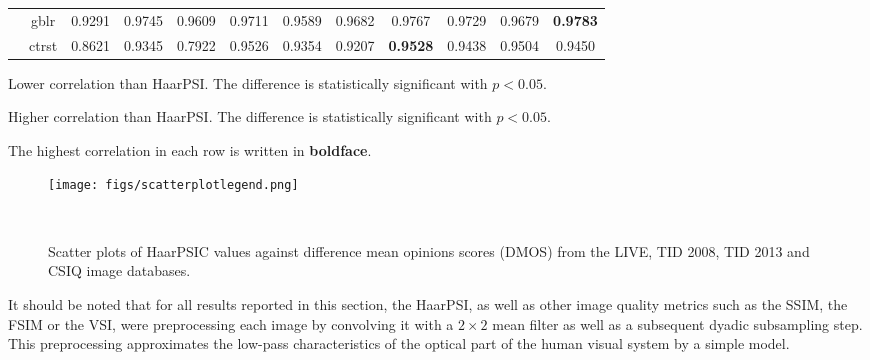 \documentclass[11pt,a4paper]{article}
\begin{document}
\begin{table}[!htb]
\begin{scriptsize}
\begin{threeparttable}
\begin{tabular}{*{12}{c}}
				& gblr & \cellcolor{green!25}0.9291 & 0.9745 & \cellcolor{green!25}0.9609 & 0.9711 & \cellcolor{green!25}0.9589 & 0.9682 & 0.9767 & 0.9729 & 0.9679 & \textbf{0.9783}\\
				& ctrst & \cellcolor{green!25}0.8621 & 0.9345 & \cellcolor{green!25}0.7922 & 0.9526 & 0.9354 & 0.9207 & \textbf{0.9528} & 0.9438 & 0.9504 & 0.9450\\\midrule[0.5mm]
			\end{tabular}
			\begin{tablenotes}
				\item \colorbox{green!25}{Lower correlation than HaarPSI. The difference is statistically significant with $p < 0.05$.}
				\item \colorbox{red!25}{Higher correlation than HaarPSI. The difference is statistically significant with $p < 0.05$.}
				\item The highest correlation in each row is written in \textbf{boldface}.
			\end{tablenotes}
		\end{threeparttable}
	\end{scriptsize}
\end{table}



\begin{figure}[!htb]
	\begin{minipage}{0.35\linewidth}
		\texttt{[image: figs/scatterplotlegend.png]}
	\end{minipage}\hfil
	\begin{minipage}{0.6\linewidth}
		\hfil{}\\\hfil{}
	\end{minipage}
	\caption{Scatter plots of HaarPSIC values against difference mean opinions scores (DMOS)  from the LIVE, TID 2008, TID 2013 and CSIQ image databases.}
	\label{fig:scatterplots}
\end{figure}

It should be noted that for all results reported in this section,
the HaarPSI, as well as other image quality metrics such as the SSIM, the FSIM or the VSI, were preprocessing each image by convolving it with a $2\times2$ mean filter as well as a subsequent dyadic subsampling step. This preprocessing approximates the
low-pass characteristics of the optical part of the human visual system
\cite{palmer1999vision} by a simple model.
\end{document}

